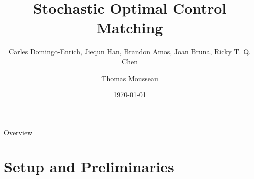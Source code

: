 \documentclass[aspectratio=169,xcolor=dvipsnames]{beamer}
\title{Stochastic Optimal Control Matching}
\subtitle{Carles Domingo-Enrich, Jiequn Han, Brandon Amos, Joan Bruna, Ricky T. Q. Chen}
\author{Thomas Mousseau}
\date{\today} %
\begin{document}
\begin{frame}
    \titlepage
\end{frame}

\begin{frame}{Overview}
    \tableofcontents
\end{frame}

\section{Setup and Preliminaries}
\end{document}
